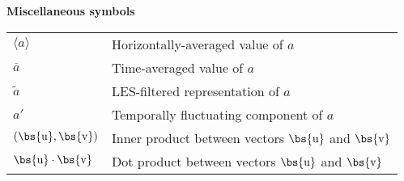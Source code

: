 \textbf{Miscellaneous symbols}

\begin{tabular}{ p{2cm}  l }
	$\langle a \rangle$ & Horizontally-averaged value of $a$\\
	$\overline{a}$      & Time-averaged value of $a$\\
	$\widetilde{a}$     & LES-filtered representation of $a$\\
	$a'$  				& Temporally fluctuating component of $a$\\
	$(\bs{\rm u}, \bs{\rm v})$ & Inner product between vectors $\bs{\rm u}$ and $\bs{\rm v}$\\
	$\bs{\rm u} \cdot \bs{\rm v}$ & Dot product between vectors $\bs{\rm u}$ and $\bs{\rm v}$\\
\end{tabular}